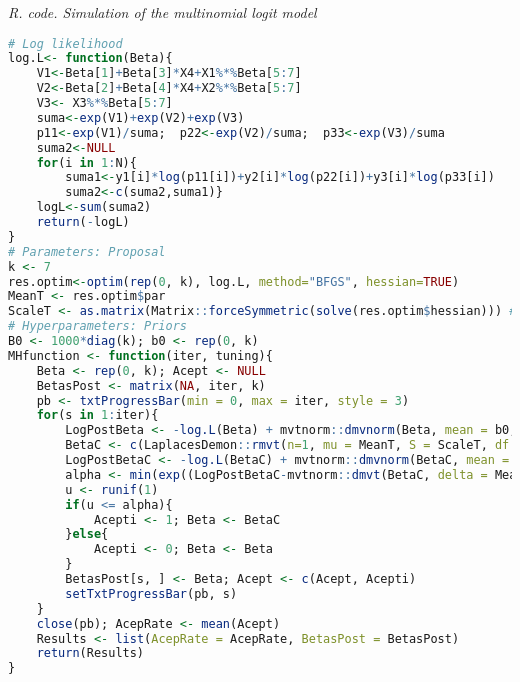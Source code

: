 \begin{tcolorbox}[enhanced,width=4.67in,center upper,
	fontupper=\large\bfseries,drop shadow southwest,sharp corners]
	\textit{R. code. Simulation of the multinomial logit model}
	\begin{VF}
		\begin{lstlisting}[language=R]		
# Log likelihood
log.L<- function(Beta){
	V1<-Beta[1]+Beta[3]*X4+X1%*%Beta[5:7]
	V2<-Beta[2]+Beta[4]*X4+X2%*%Beta[5:7]
	V3<- X3%*%Beta[5:7]
	suma<-exp(V1)+exp(V2)+exp(V3)
	p11<-exp(V1)/suma; 	p22<-exp(V2)/suma; 	p33<-exp(V3)/suma
	suma2<-NULL
	for(i in 1:N){
		suma1<-y1[i]*log(p11[i])+y2[i]*log(p22[i])+y3[i]*log(p33[i])
		suma2<-c(suma2,suma1)}
	logL<-sum(suma2)
	return(-logL)
}
# Parameters: Proposal
k <- 7
res.optim<-optim(rep(0, k), log.L, method="BFGS", hessian=TRUE)
MeanT <- res.optim$par
ScaleT <- as.matrix(Matrix::forceSymmetric(solve(res.optim$hessian))) # Force this matrix to be symmetric
# Hyperparameters: Priors
B0 <- 1000*diag(k); b0 <- rep(0, k)
MHfunction <- function(iter, tuning){
	Beta <- rep(0, k); Acept <- NULL 
	BetasPost <- matrix(NA, iter, k)
	pb <- txtProgressBar(min = 0, max = iter, style = 3)
	for(s in 1:iter){
		LogPostBeta <- -log.L(Beta) + mvtnorm::dmvnorm(Beta, mean = b0, sigma = B0, log = TRUE)
		BetaC <- c(LaplacesDemon::rmvt(n=1, mu = MeanT, S = ScaleT, df = tuning))
		LogPostBetaC <- -log.L(BetaC) + mvtnorm::dmvnorm(BetaC, mean = b0, sigma = B0, log = TRUE)
		alpha <- min(exp((LogPostBetaC-mvtnorm::dmvt(BetaC, delta = MeanT, sigma = ScaleT, df = tuning, log = TRUE))-(LogPostBeta-mvtnorm::dmvt(Beta, delta = MeanT, sigma = ScaleT, df = tuning, log = TRUE))) ,1)
		u <- runif(1)
		if(u <= alpha){
			Acepti <- 1; Beta <- BetaC
		}else{
			Acepti <- 0; Beta <- Beta
		}
		BetasPost[s, ] <- Beta; Acept <- c(Acept, Acepti)
		setTxtProgressBar(pb, s)
	}
	close(pb); AcepRate <- mean(Acept)
	Results <- list(AcepRate = AcepRate, BetasPost = BetasPost)
	return(Results)
}
\end{lstlisting}
	\end{VF}
\end{tcolorbox} 



